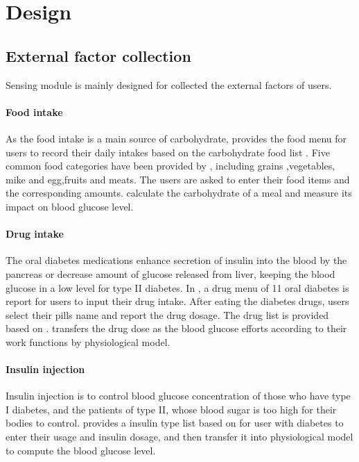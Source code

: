 
\section{Design}
\label{sec:design}

\subsection{External factor collection}
\label{subsec:external}
Sensing module is mainly designed for collected the external factors of users.

\paragraph{Food intake}
As the food intake is a main source of carbohydrate, \sysname provides the food menu for users to record their daily intakes based on the carbohydrate food list \cite{bib:carblist}.
Five common food categories have been provided by \sysname, including grains ,vegetables, mike and egg,fruits and meats. The users are asked to enter their food items and the corresponding amounts. \sysname calculate the carbohydrate of a meal and measure its impact on blood glucose level.

\paragraph{Drug intake}
The oral diabetes medications enhance secretion of insulin into the blood by the pancreas or decrease amount of glucose released from liver, keeping the blood glucose in a low level for type II diabetes.
In \sysname, a drug menu of 11 oral diabetes is report for users to input their drug intake. After eating the diabetes drugs, users select their pills name and report the drug dosage. The drug list is provided based on \cite{bib:druglist}.
\sysname transfers the drug dose as the blood glucose efforts according to their work functions \cite{bib:druglist, bib:bolen2007systematic, bib:bennett2011oral}  by physiological model.

\paragraph{Insulin injection}
Insulin injection is to control blood glucose concentration of those who have type I diabetes, and the patients of type II, whose blood sugar is too high for their bodies to control. \sysname provides a insulin type list based on \cite{bib:insulinlist} for user with diabetes to enter their usage and insulin dosage, and then transfer it into physiological model to compute the blood glucose level.

